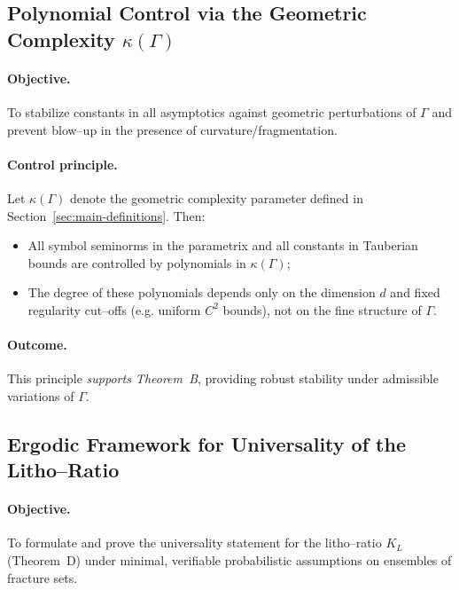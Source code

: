 \subsection{Polynomial Control via the Geometric Complexity \texorpdfstring{\(\kappa(\Gamma)\)}{kappa(Gamma)}}

\paragraph{Objective.}
To stabilize constants in all asymptotics against geometric perturbations of
\(\Gamma\) and prevent blow–up in the presence of curvature/fragmentation.

\paragraph{Control principle.}
Let \(\kappa(\Gamma)\) denote the geometric complexity parameter defined in
Section~\ref{sec:main-definitions}. Then:
\begin{itemize}
  \item All symbol seminorms in the parametrix and all constants in Tauberian
  bounds are controlled by polynomials in \(\kappa(\Gamma)\);
  \item The degree of these polynomials depends only on the dimension \(d\) and
  fixed regularity cut–offs (e.g. uniform \(C^2\) bounds), not on the fine
  structure of \(\Gamma\).
\end{itemize}

\paragraph{Outcome.}
This principle \emph{supports Theorem~B}, providing robust stability under
admissible variations of \(\Gamma\).

\subsection{Ergodic Framework for Universality of the Litho–Ratio}

\paragraph{Objective.}
To formulate and prove the universality statement for the litho–ratio
\(K_L\) (Theorem~D) under minimal, verifiable probabilistic assumptions on
ensembles of fracture sets.

